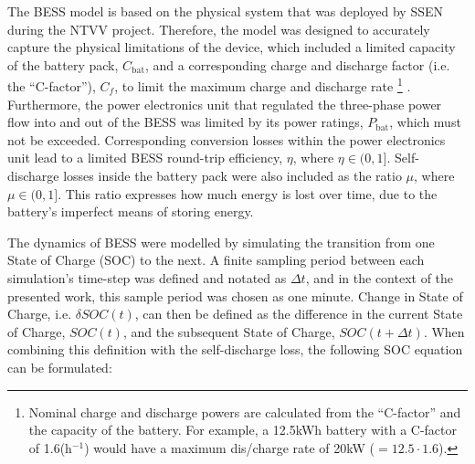 \nomenclature{$\mu$}{Self-discharge losses of battery, where $\mu \in (0, 1]$ (Chapter \ref{ch2})}
\nomenclature{$\eta$}{Round-trip efficiency of power electronics, where $\eta \in (0, 1]$ (Chapter \ref{ch2})}

The BESS model is based on the physical system that was deployed by SSEN during the NTVV project.
Therefore, the model was designed to accurately capture the physical limitations of the device, which included a limited capacity of the battery pack, $C_\text{bat}$, and a corresponding charge and discharge factor (i.e. the ``C-factor''), $C_{f}$, to limit the maximum charge and discharge rate
\footnote{Nominal charge and discharge powers are calculated from the ``C-factor'' and the capacity of the battery. For example, a 12.5kWh battery with a C-factor of 1.6(h$^{-1}$) would have a maximum dis/charge rate of 20kW ($=12.5 \cdot 1.6$).}
.
Furthermore, the power electronics unit that regulated the three-phase power flow into and out of the BESS was limited by its power ratings, $P_\text{bat}$, which must not be exceeded.
Corresponding conversion losses within the power electronics unit lead to a limited BESS round-trip efficiency, $\eta$, where $\eta \in (0, 1]$.
Self-discharge losses inside the battery pack were also included as the ratio $\mu$, where $\mu \in (0, 1]$.
This ratio expresses how much energy is lost over time, due to the battery's imperfect means of storing energy.

The dynamics of BESS were modelled by simulating the transition from one State of Charge (SOC) to the next.
A finite sampling period between each simulation's time-step was defined and notated as $\Delta t$, and in the context of the presented work, this sample period was chosen as one minute.
Change in State of Charge, i.e. $\delta SOC(t)$, can then be defined as the difference in the current State of Charge, $SOC(t)$, and the subsequent State of Charge, $SOC(t+\Delta t)$.
When combining this definition with the self-discharge loss, the following SOC equation can be formulated:

